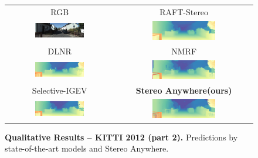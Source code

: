 \documentclass[10pt,twocolumn,letterpaper]{article}
\newcommand{\method}[0]{Stereo Anywhere\xspace}
\begin{document}
\begin{figure}[h]
\begin{tabular}{cc}
        \small RGB &
        \small RAFT-Stereo \cite{lipson2021raft} \\
        \includegraphics[width=0.48\textwidth]{imgs/KITTI12/rgb/127.jpg} &
        \includegraphics[width=0.48\textwidth]{imgs/KITTI12/stereo/RAFT-Stereo/127.jpg} \\
        \small DLNR \cite{zhao2023high} &
        \small NMRF \cite{guan2024neural} \\
        \includegraphics[width=0.48\textwidth]{imgs/KITTI12/stereo/DLNR/127.jpg} &
        \includegraphics[width=0.48\textwidth]{imgs/KITTI12/stereo/NMRF/127.jpg} \\
        \small Selective-IGEV \cite{wang2024selective} &
        \textbf{\method (ours)} \\
        \includegraphics[width=0.48\textwidth]{imgs/KITTI12/stereo/Selective/127.jpg} &
        \includegraphics[width=0.48\textwidth]{imgs/KITTI12/stereo/Ours/127.jpg} \\
    \end{tabular}\vspace{-0.3cm}
    \caption{\textbf{Qualitative Results -- KITTI 2012 (part 2).} Predictions by state-of-the-art models and \method.}
    \label{fig:qual_kitti12_2}\vspace{-0.3cm}
\end{figure}
\end{document}
